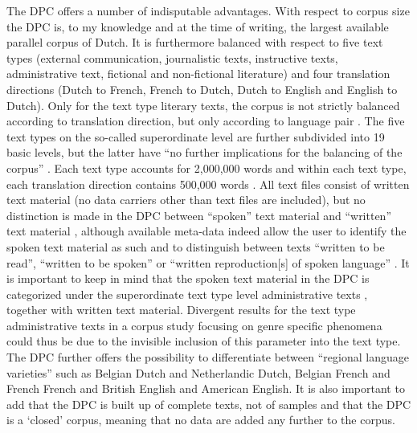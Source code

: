 The DPC offers a number of indisputable advantages. With respect to corpus size the DPC is, to my knowledge and at the time of writing, the largest available parallel corpus of Dutch. It is furthermore balanced with respect to five text types (external communication, journalistic texts, instructive texts, administrative text, fictional and non-fictional literature) and four translation directions (Dutch to French, French to Dutch, Dutch to English and English to Dutch). Only for the text type literary texts, the corpus is not strictly balanced according to translation direction, but only according to language pair \citep[187]{spyns_dutch_2013}. The five text types on the so-called superordinate level are further subdivided into 19 basic levels, but the latter have “no further implications for the balancing of the corpus” \citep[378]{macken_dutch_2011}. Each text type accounts for 2,000,000 words and within each text type, each translation direction contains 500,000 words \citep[376--378]{macken_dutch_2011}. All text files consist of written text material (no data carriers other than text files are included), but no distinction is made in the DPC between “spoken” text material and “written” text material \citep[59]{delaere_translations_2015}, although available meta-data indeed allow the user to identify the spoken text material as such and to distinguish between texts “written to be read”, “written to be spoken” or  “written reproduction[s] of spoken language” \citep[59]{delaere_translations_2015}. It is important to keep in mind that the spoken text material in the DPC is categorized under the superordinate text type level administrative texts \citep[59]{delaere_translations_2015}, together with written text material. Divergent results for the text type administrative texts in a corpus study focusing on genre specific phenomena could thus be due to the invisible inclusion of this parameter into the text type. The DPC further offers the possibility to differentiate between “regional language varieties” \citep[48]{delaere_translations_2015} such as Belgian Dutch and Netherlandic Dutch, Belgian French and French French and British English and American English. It is also important to add that the DPC is built up of complete texts, not of samples and that the DPC is a ‘closed’ corpus, meaning that no data are added any further to the corpus.

